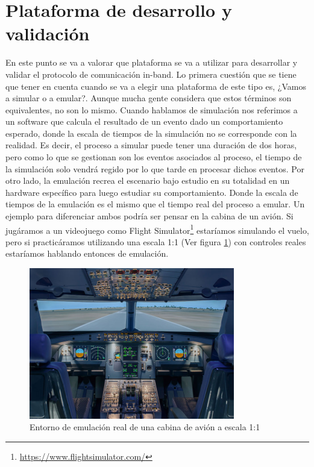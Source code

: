 \section{Plataforma de desarrollo y validación}
\label{sec:ana_mininet_wifi}

En este punto se va a valorar que plataforma se va a utilizar para desarrollar y validar el protocolo de comunicación in-band. Lo primera cuestión que se tiene que tener en cuenta cuando se va a elegir una plataforma de este tipo es, ¿Vamos a simular o a emular?. Aunque mucha gente considera que estos términos son equivalentes, no son lo mismo. Cuando hablamos de simulación nos referimos a un software que calcula el resultado de un evento dado un comportamiento esperado, donde la escala de tiempos de la simulación no se corresponde con la realidad. Es decir, el proceso a simular puede tener una duración de dos horas, pero como lo que se gestionan son los eventos asociados al proceso, el tiempo de la simulación solo vendrá regido por lo que tarde en procesar dichos eventos. Por otro lado, la emulación recrea el escenario bajo estudio en su totalidad en un hardware específico para luego estudiar su comportamiento. Donde la escala de tiempos de la emulación es el mismo que el tiempo real del proceso a emular. Un ejemplo para diferenciar ambos podría ser pensar en la cabina de un avión. Si jugáramos a un videojuego como Flight Simulator\footnote{\url{https://www.flightsimulator.com/}} estaríamos simulando el vuelo, pero si practicáramos utilizando una escala 1:1 (Ver figura \ref{fig:emu_simu}) con controles reales estaríamos hablando entonces de emulación.\\

\begin{figure}[ht!]
    \centering
    \includegraphics[width=0.8\textwidth]{archivos/img/analisis/emu_simu.jpeg}
    \caption{Entorno de emulación real de una cabina de avión a escala 1:1 \cite{emusim}}
    \label{fig:emu_simu}
\end{figure}

